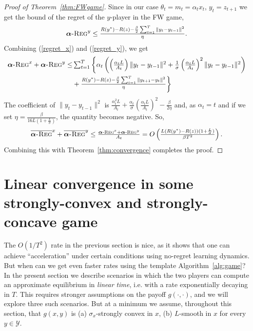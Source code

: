 \documentclass[final,12pt]{colt2018} %
\def\balpha{\boldsymbol{\alpha}}
\newcommand{\regret}[1]{\balpha\textsc{-Reg}^{#1}}
\newcommand{\avgregret}[1]{\overline{\balpha\textsc{-Reg}}^{#1}}
\newcommand{\YY}{\mathcal{Y}}
\newcommand{\pr}[1]{\left(#1\right)}
\begin{document}
\begin{proof}[Proof of Theorem~\ref{thm:FWgame}]
	Since in our case $\theta_t = m_{t} = \alpha_{t} x_{t}$, $y_{t}=z_{{t+1}}$
	we get the bound of the regret of the $y$-player in the FW game,
	\begin{equation} \label{regret_y}
\textstyle	\regret{y} \leq \frac{  R(y^*) - R(z) - \frac{\beta}{2} \sum_{{t=1}}^{T} \| y_{t} - y_{t-1} \|^2}{\eta}.
	\end{equation}
	Combining (\ref{regret_x}) and (\ref{regret_y}),
	we get 
	\begin{equation} \label{regretxy}
	\begin{aligned}
\textstyle	\regret{x} + \regret{y} 
\textstyle	\leq & \textstyle \sum_{t=1}^T \textstyle \bigg\{
	\alpha_t  \pr{\pr{\frac{\alpha_t L}{A_t}} \| y_t - y_{t-1} \|^2 + \frac{1}{\sigma} \pr{\frac{\alpha_t L }{A_t}}^2  \| y_t - y_{t-1} \|^2 } \\ & \textstyle + \frac{ R(y^*) - R(z) - \frac{\beta}{2} \sum_{{t=1}}^{T} \| y_{t+1} - y_t \|^2}{\eta} \bigg\}
	\end{aligned}
	\end{equation}
	The coefficient of $\| y_t - y_{t-1} \|^2$ is $\frac{\alpha_t^2 L}{A_t} +  \frac{\alpha_t}{\sigma} (\frac{\alpha_t L }{A_t})^2 - \frac{\beta}{2 \eta }$ and, as $\alpha_{t}=t$ and if we set $\eta =\frac{\beta }{ 16L ( 1 + \frac{L}{\sigma})}$, the quantity becomes negative.
	So,
	\begin{equation} \label{theRate}
\textstyle	\avgregret{x} + \avgregret{y}
	\leq  \frac{
		\regret{x} + \regret{y} }{  A_t}
	= O\pr{ \frac{ L ( R(y^*) -R(z) )(1+\frac{L}{\sigma}) }{ \beta T^2}}.
	\end{equation}
	Combining this with Theorem~\ref{thm:convergence} completes the proof. \end{proof}
 

\section{Linear convergence in some strongly-convex and strongly-concave game}

The $O(1/T^2)$ rate in the previous section is nice, as it shows that one can achieve ``acceleration'' under certain conditions using no-regret learning dynamics. But when can we get even faster rates using the template Algorithm~\ref{alg:game}? In the present section we describe scenarios in which the two players can compute an approximate equilibrium in \emph{linear time}, i.e. with a rate exponentially decaying in $T$. This requires stronger assumptions on the payoff $g(\cdot,\cdot)$, and we will explore three such scenarios. But at a minimum we assume, throughout this section, that $g(x,y)$ is (a) $\sigma_x$-strongly convex in $x$, (b) $L$-smooth in $x$ for every $y \in \YY$.
\end{document}

